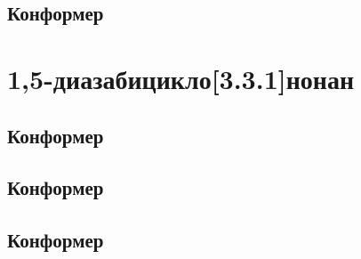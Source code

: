 \subsection{Конформер \TT{}}

\section{1,5-диазабицикло[3.3.1]нонан}

\subsection{Конформер \BC{}}


\subsection{Конформер \CC{}}


\subsection{Конформер \TT{}}


